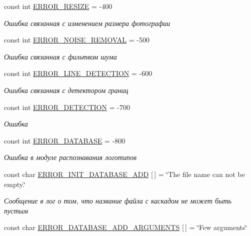 \begin{DoxyCompactItemize}
const int \mbox{\hyperlink{namespaceyenot_a787166b1304265d12d6ff10b175a66bc}{E\+R\+R\+O\+R\+\_\+\+R\+E\+S\+I\+ZE}} = -\/400
\begin{DoxyCompactList}\small\item\em Ошибка связанная с изменением размера фотографии \end{DoxyCompactList}\item 
const int \mbox{\hyperlink{namespaceyenot_a0699d20f9a904f7faf8b63cc7fc31c63}{E\+R\+R\+O\+R\+\_\+\+N\+O\+I\+S\+E\+\_\+\+R\+E\+M\+O\+V\+AL}} = -\/500
\begin{DoxyCompactList}\small\item\em Ошибка связанная с фильтвом шума \end{DoxyCompactList}\item 
const int \mbox{\hyperlink{namespaceyenot_ab63291c5dfdea5865dc7a32401095215}{E\+R\+R\+O\+R\+\_\+\+L\+I\+N\+E\+\_\+\+D\+E\+T\+E\+C\+T\+I\+ON}} = -\/600
\begin{DoxyCompactList}\small\item\em Ошибка связанная с детектором границ \end{DoxyCompactList}\item 
const int \mbox{\hyperlink{namespaceyenot_af6dc289a999d852dd3da0134f47cda0f}{E\+R\+R\+O\+R\+\_\+\+D\+E\+T\+E\+C\+T\+I\+ON}} = -\/700
\begin{DoxyCompactList}\small\item\em Ошибка \end{DoxyCompactList}\item 
const int \mbox{\hyperlink{namespaceyenot_a34fbed9d403672deb1f0f73139f26ee6}{E\+R\+R\+O\+R\+\_\+\+D\+A\+T\+A\+B\+A\+SE}} = -\/800
\begin{DoxyCompactList}\small\item\em Ошибка в модуле распознавания логотипов \end{DoxyCompactList}\item 
const char \mbox{\hyperlink{namespaceyenot_af958287fcf5b41e632a87bd1a795c74b}{E\+R\+R\+O\+R\+\_\+\+I\+N\+I\+T\+\_\+\+D\+A\+T\+A\+B\+A\+S\+E\+\_\+\+A\+DD}} \mbox{[}$\,$\mbox{]} = \char`\"{}The file name can not be empty.\char`\"{}
\begin{DoxyCompactList}\small\item\em Сообщение в лог о том, что название файла с каскадом не может быть пустым \end{DoxyCompactList}\item 
const char \mbox{\hyperlink{namespaceyenot_adec37b1319feb436842ed87c9741df97}{E\+R\+R\+O\+R\+\_\+\+D\+A\+T\+A\+B\+A\+S\+E\+\_\+\+A\+D\+D\+\_\+\+A\+R\+G\+U\+M\+E\+N\+TS}} \mbox{[}$\,$\mbox{]} = \char`\"{}Few arguments\char`\"{}

\end{DoxyCompactItemize}
